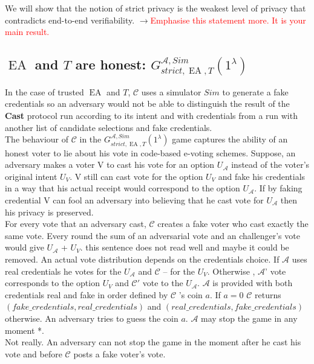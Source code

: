 \documentclass[12pt]{article}
\newcommand{\fix}[2]{\sout{#1}$\rightarrow$\textcolor{red}{#2}}
\DeclareMathOperator{\ea}{EA}
\begin{document}
We will show that the notion of strict privacy is the weakest level of privacy that contradicts end-to-end verifiability. \fix{}{Emphasise this statement more. It is your main result.}

\subsection{$\ea$ and $T$ are honest: $G_{strict,\ea,T}^{\mathcal{A}, Sim}(1^{\lambda})$}
In the case of trusted $\ea$ and $T$,  $\mathcal{C}$ uses a simulator $Sim$ to generate a fake credentials so an adversary would not be able to distinguish the result of the \textbf{Cast} protocol run according to its intent and with credentials from a run with another list of candidate selections and fake credentials. \\

The behaviour of $\mathcal{C}$  in the  $G_{strict,\ea,T}^{\mathcal{A}, Sim}(1^{\lambda})$ game captures the ability of an honest voter to lie about his vote in code-based e-voting schemes. Suppose, an adversary  makes a voter V to cast his vote for an option $U_{\mathcal{A}}$ instead of the voter's original intent $U_{V}$.  V still can cast vote for the option $U_{V}$ and fake his credentials in a way that his actual receipt would correspond to the option $U_{\mathcal{A}}$. If by faking credential V can fool an adversary into believing that he cast vote for $U_{\mathcal{A}}$ then his privacy is preserved. \\

For every vote that an adversary cast, $\mathcal{C}$ creates a fake voter who cast exactly the same vote. Every round the sum of an adversarial vote and an challenger's vote would give $U_{\mathcal{A}}$ + $U_{V}$. {\color{red} this sentence does not read well and maybe it could be removed}. An actual vote distribution depends on the credentials choice. If $\mathcal{A}$ uses real credentials he votes for the $U_{\mathcal{A}}$ and  $\mathcal{C}$ --  for the $U_{V}$. Otherwise , $\mathcal{A}$' vote corresponds to  the  option $U_{V}$  and  $\mathcal{C}'$ vote to the $U_{\mathcal{A}}$. $\mathcal{A}$ is provided with both credentials real and fake in order defined by $\mathcal{C}$ 's coin $a$. If $a=0$ $\mathcal{C}$  returns $(fake\_credentials,real\_credentials)$ and $(real\_credentials,fake\_credentials)$ otherwise. An adversary tries to guess the coin $a$. $\mathcal{A}$ may stop the game in any moment  {\color{red}*}. \\
{\color{red} Not really. An adversary can not stop the game in the moment after he cast his vote and before $\mathcal{C}$ posts a fake voter's vote.}
\end{document}
